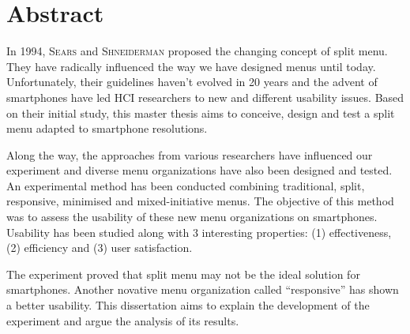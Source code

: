 \chapter*{Abstract}
In 1994, \textsc{Sears} and \textsc{Shneiderman} proposed the changing concept 
of split menu. They have radically influenced the way we have designed menus 
until today. Unfortunately, their guidelines haven't evolved in 20 years and 
the advent of smartphones have led HCI researchers to new and different 
usability issues. Based on their initial study, this master thesis aims to 
conceive, design and test a split menu adapted to smartphone 
resolutions.\newline

Along the way, the approaches from various researchers have influenced our 
experiment and diverse menu organizations have also been designed and tested. 
An experimental method has been conducted combining traditional, split, 
responsive, minimised and mixed-initiative menus. The objective of this method 
was to assess the usability of these new menu organizations on smartphones. 
Usability has been studied along with 3 interesting properties: (1) 
effectiveness, (2) efficiency and (3) user satisfaction.\newline

The experiment proved that split menu may not be the ideal solution for 
smartphones. Another novative menu organization called \enquote{responsive} 
has shown a better usability. This dissertation aims to explain the development 
of the experiment and argue the analysis of its results.